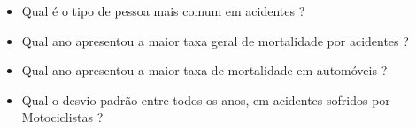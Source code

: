 \documentclass[12pt]{article}
\begin{document}
\begin{itemize}
    \item Qual é o tipo de pessoa mais comum em acidentes ?
    \item Qual ano apresentou a maior taxa geral de mortalidade por acidentes ?
    \item Qual ano apresentou a maior taxa de mortalidade em automóveis ?
    \item Qual o desvio padrão entre todos os anos, em acidentes sofridos por Motociclistas ?
\end{itemize}




% 
% 
\end{document}
